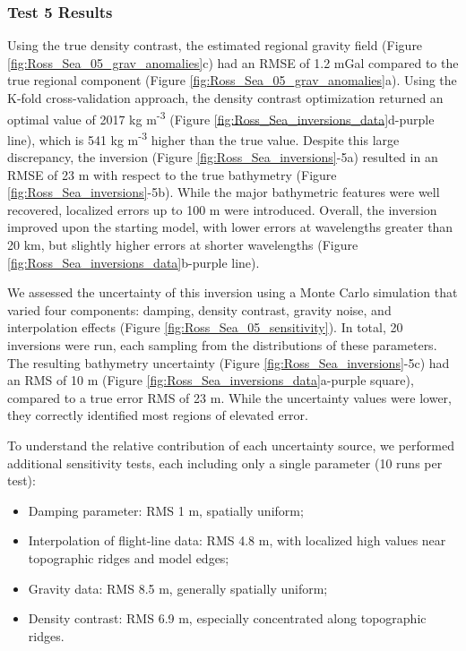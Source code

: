 \documentclass[tc, manuscript]{copernicus}
\begin{document}
\subsubsection{Test 5 Results}
Using the true density contrast, the estimated regional gravity field (Figure \ref{fig:Ross_Sea_05_grav_anomalies}c) had an RMSE of 1.2 mGal compared to the true regional component (Figure \ref{fig:Ross_Sea_05_grav_anomalies}a). Using the K-fold cross-validation approach, the density contrast optimization returned an optimal value of 2017 kg m\textsuperscript{-3} (Figure \ref{fig:Ross_Sea_inversions_data}d-purple line), which is 541 kg m\textsuperscript{-3} higher than the true value. Despite this large discrepancy, the inversion (Figure \ref{fig:Ross_Sea_inversions}-5a) resulted in an RMSE of 23 m with respect to the true bathymetry (Figure \ref{fig:Ross_Sea_inversions}-5b). While the major bathymetric features were well recovered, localized errors up to 100 m were introduced. Overall, the inversion improved upon the starting model, with lower errors at wavelengths greater than 20 km, but slightly higher errors at shorter wavelengths (Figure \ref{fig:Ross_Sea_inversions_data}b-purple line).

We assessed the uncertainty of this inversion using a Monte Carlo simulation that varied four components: damping, density contrast, gravity noise, and interpolation effects (Figure \ref{fig:Ross_Sea_05_sensitivity}). In total, 20 inversions were run, each sampling from the distributions of these parameters. The resulting bathymetry uncertainty (Figure \ref{fig:Ross_Sea_inversions}-5c) had an RMS of 10 m (Figure \ref{fig:Ross_Sea_inversions_data}a-purple square), compared to a true error RMS of 23 m. While the uncertainty values were lower, they correctly identified most regions of elevated error.

To understand the relative contribution of each uncertainty source, we performed additional sensitivity tests, each including only a single parameter (10 runs per test):
\begin{itemize}
    \item Damping parameter: RMS 1 m, spatially uniform;
    \item Interpolation of flight-line data: RMS 4.8 m, with localized high values near topographic ridges and model edges;
    \item Gravity data: RMS 8.5 m, generally spatially uniform;
    \item Density contrast: RMS 6.9 m, especially concentrated along topographic ridges.
\end{itemize}
\end{document}
